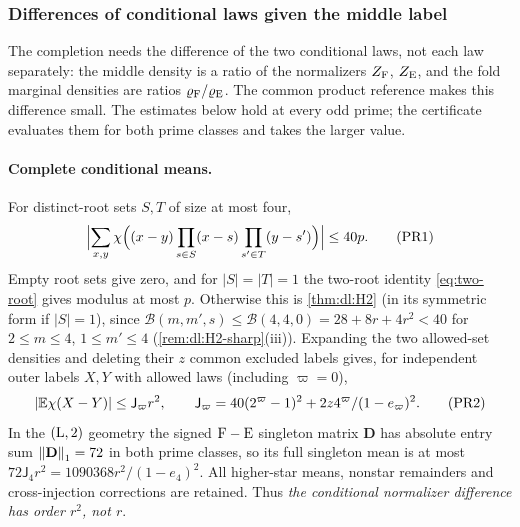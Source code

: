 \subsubsection{Differences of conditional laws given the middle label}\label{subsec:advance:product-rows}
The completion needs the difference of the two conditional laws, not each law
separately: the middle density is a ratio of the normalizers $Z_{\rm F}$, $Z_{\rm E}$,
and the fold marginal densities are ratios $\varrho_{\rm F}/\varrho_{\rm E}$. The
common product reference makes this difference small. The estimates below hold at
every odd prime; the certificate evaluates them for both prime classes and takes the
larger value.

\paragraph{Complete conditional means.}
For distinct-root sets $S,T$ of size at most four,
\[
 \Bigl|\sum_{x,y}\chi\Bigl((x-y)\prod_{s\in S}(x-s)\prod_{s'\in T}(y-s')\Bigr)\Bigr|
 \le40p .\tag{PR1}
\]
Empty root sets give zero, and for $|S|=|T|=1$ the two-root identity
\eqref{eq:two-root} gives modulus at most $p$. Otherwise this is \cref{thm:dl:H2}
(in its symmetric form if $|S|=1$), since $\mathcal B(m,m',s)\le\mathcal B(4,4,0)=
28+8r+4r^2<40$ for $2\le m\le4$, $1\le m'\le4$ (\cref{rem:dl:H2-sharp}(iii)). Expanding the
two allowed-set densities and deleting their $z$ common excluded labels gives, for
independent outer labels $X,Y$ with allowed laws (including $\varpi=0$),
\[
 |\mathbb E\chi(X-Y)|\le\mathsf J_\varpi r^2,\qquad
 \mathsf J_\varpi=40(2^\varpi-1)^2+2z4^\varpi/(1-e_\varpi)^2 .\tag{PR2}
\]
In the $({\rm L},2)$ geometry the signed $\rm F-E$ singleton matrix $\mathbf D$ has
absolute entry sum $\left\|\mathbf D\right\|_1=72$ in both prime classes, so its full singleton
mean is at most $72\mathsf J_4r^2=1090368r^2/(1-e_4)^2$. All higher-star means, nonstar
remainders and cross-injection corrections are retained. Thus \emph{the conditional
normalizer difference has order $r^2$, not $r$}.

